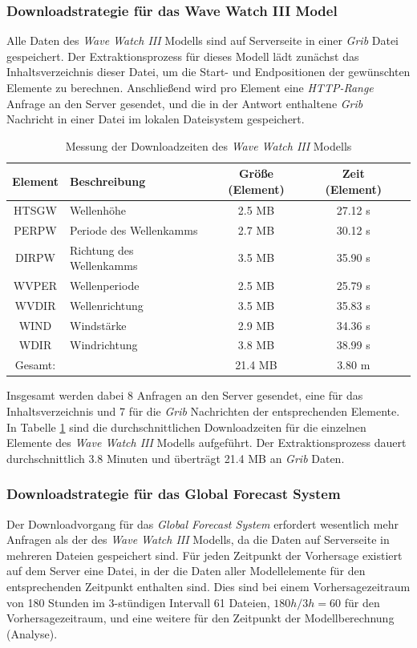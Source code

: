 \subsubsection{Downloadstrategie für das Wave Watch III Model}
Alle Daten des \textit{Wave Watch III} Modells sind auf Serverseite in
einer \textit{Grib} Datei gespeichert. Der Extraktionsprozess für
dieses Modell lädt zunächst das Inhaltsverzeichnis dieser Datei, um
die Start- und Endpositionen der gewünschten Elemente zu
berechnen. Anschließend wird pro Element eine \textit{HTTP-Range}
Anfrage an den Server gesendet, und die in der Antwort enthaltene
\textit{Grib} Nachricht in einer Datei im lokalen Dateisystem
gespeichert.

\begin{table}[h]
  \centering
  {\sf
    \footnotesize
    \begin{longtable}{@{}clccc}
      \toprule
      \textbf{Element} & \textbf{Beschreibung} & \textbf{Größe (Element)} & \textbf{Zeit (Element)}  \\
      \midrule
      HTSGW & Wellenhöhe & 2.5 MB & 27.12 s \\
      PERPW & Periode des Wellenkamms & 2.7 MB & 30.12 s \\
      DIRPW & Richtung des Wellenkamms & 3.5 MB & 35.90 s \\
      WVPER & Wellenperiode & 2.5 MB & 25.79 s \\
      WVDIR & Wellenrichtung & 3.5 MB & 35.83 s \\
      WIND  & Windstärke & 2.9 MB & 34.36 s \\
      WDIR  & Windrichtung & 3.8 MB & 38.99 s \\
      \midrule
      Gesamt: & & 21.4 MB & 3.80 m \\
      \bottomrule
    \end{longtable}
  }
  \caption{Messung der Downloadzeiten des \textit{Wave Watch III} Modells}
  \label{tab:download_messung_ww3}
\end{table}

Insgesamt werden dabei 8 Anfragen an den Server gesendet, eine für das
Inhaltsverzeichnis und 7 für die \textit{Grib} Nachrichten der
entsprechenden Elemente. In Tabelle \ref{tab:download_messung_ww3}
sind die durchschnittlichen Downloadzeiten für die einzelnen Elemente
des \textit{Wave Watch III} Modells aufgeführt. Der Extraktionsprozess
dauert durchschnittlich 3.8 Minuten und überträgt 21.4 MB an
\textit{Grib} Daten.

\subsubsection{Downloadstrategie für das Global Forecast System}
Der Downloadvorgang für das \textit{Global Forecast System} erfordert
wesentlich mehr Anfragen als der des \textit{Wave Watch III} Modells,
da die Daten auf Serverseite in mehreren Dateien gespeichert sind. Für
jeden Zeitpunkt der Vorhersage existiert auf dem Server eine Datei, in
der die Daten aller Modellelemente für den entsprechenden Zeitpunkt
enthalten sind. Dies sind bei einem Vorhersagezeitraum von 180 Stunden
im 3-stündigen Intervall 61 Dateien, $180h / 3h = 60$ für den
Vorhersagezeitraum, und eine weitere für den Zeitpunkt der
Modellberechnung (Analyse).

